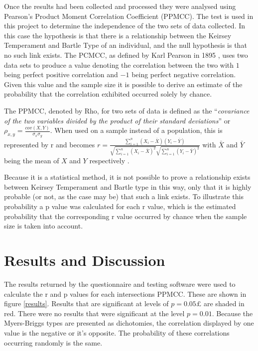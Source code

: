 \documentclass[12pt,a4paper,twoside]{report}
\begin{document}
Once the results had been collected and processed they were analysed using Pearson's Product Moment Correlation Coefficient (PPMCC). The test is used in this project to determine the independence of the two sets of data collected. In this case the hypothesis is that there is a relationship between the Keirsey Temperament and Bartle Type of an individual, and the null hypothesis is that no such link exists. The PCMCC, as defined by Karl Pearson in 1895 \cite{pearson1895note}, uses two data sets to produce a value denoting the correlation between the two with $1$ being perfect positive correlation and $-1$ being perfect negative correlation. Given this value and the sample size it is possible to derive an estimate of the probability that the correlation exhibited occurred solely by chance. 

The PPMCC, denoted by Rho, for two sets of data is defined as the ``\textit{covariance of the two variables divided by the product of their standard deviations}'' \cite{wiki-ppmcc} or $\rho_{x,y}=\frac{cov(X,Y)}{\sigma_x \sigma_y}$. When used on a sample instead of a population, this is represented by r and becomes $r=\frac{\sum_{i=1}^{n}(X_i-\bar{X})(Y_i-\bar{Y})}{\sqrt{\sum_{i=1}^{n}(X_i-\bar{X})^2}\sqrt{\sum_{i=1}^{n}(Y_i-\bar{Y})^2}}$ with $\bar{X}$ and $\bar{Y}$ being the mean of $X$ and $Y$ respectively \cite{pearson1895note}. 

\vspace{0.1cm}
Because it is a statistical method, it is not possible to prove a relationship exists between Keirsey Temperament and Bartle type in this way, only that it is highly probable (or not, as the case may be) that such a link exists. To illustrate this probability a p value was calculated for each r value, which is the estimated probability that the corresponding r value occurred by chance when the sample size is taken into account.

\section{Results and Discussion}
The results returned by the questionnaire and testing software were used to calculate the r and p values for each intersections PPMCC. These are shown in figure \ref{results}. Results that are significant at levels of $p = 0.05£$ are shaded in red. There were no results that were significant at the level $p = 0.01$. Because the Myers-Briggs types are presented as dichotomies, the correlation displayed by one value is the negative or it's opposite. The probability of these correlations occurring randomly is the same.
\end{document}
